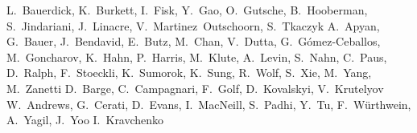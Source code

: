 \begin{Authlist}
%
L.~Bauerdick, K.~Burkett, I.~Fisk, Y.~Gao, O.~Gutsche, B.~Hooberman, S.~Jindariani, J.~Linacre, V.~Martinez~Outschoorn, S.~Tkaczyk
%
A.~Apyan, G.~Bauer, J.~Bendavid, E.~Butz, M.~Chan, V.~Dutta, G.~G\'omez-Ceballos, M.~Goncharov, K.~Hahn, P.~Harris, M.~Klute, A.~Levin, S.~Nahn, C.~Paus, D.~Ralph, F.~Stoeckli, K.~Sumorok, K.~Sung, R.~Wolf, S.~Xie, M.~Yang, M.~Zanetti
%
D.~Barge, C.~Campagnari, F.~Golf, D.~Kovalskyi, V.~Krutelyov
%
W.~Andrews, G.~Cerati, D.~Evans, I.~MacNeill, S.~Padhi, Y.~Tu, F.~W\"urthwein, A.~Yagil, J.~Yoo
%
I.~Kravchenko

\end{Authlist}
